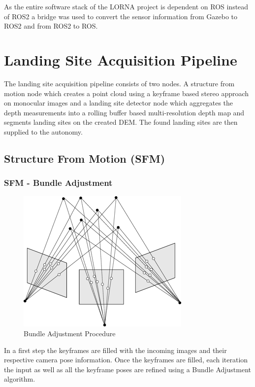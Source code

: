 As the entire software stack of the LORNA project is dependent on ROS instead of ROS2 a bridge was used to convert the sensor information from Gazebo to ROS2 and from ROS2 to ROS.


\section{Landing Site Acquisition Pipeline}\label{sec:setup:LSP}

The landing site acquisition pipeline consists of two nodes. A structure from motion node \citep{SFM} which creates a point cloud using a keyframe based stereo approach on monocular images and a landing site detector node \citep{LSD1, LSD2} which aggregates the depth measurements into a rolling buffer based multi-resolution depth map and segments landing sites on the created DEM. The found landing sites are then supplied to the autonomy. 

\subsection{Structure From Motion (SFM)}\label{subsec:setup:SFM}

\subsubsection{SFM - Bundle Adjustment}

\begin{figure}[ht!]
    \centering
    \includegraphics[scale=0.5]{images/setup/BA.png}
    \caption{Bundle Adjustment Procedure}
\end{figure}

In a first step the keyframes are filled with the incoming images and their respective camera pose information. Once the keyframes are filled, each iteration the input as well as all the keyframe poses are refined using a Bundle Adjustment algorithm. 

